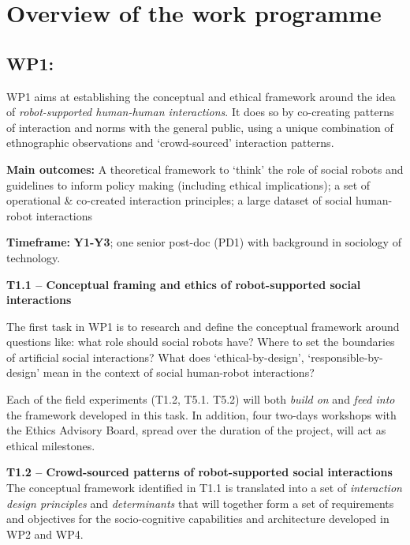 \section{Overview of the \project work programme}


\subsection{WP1: \textbf{\wpOne}}

WP1 aims at establishing the conceptual and ethical framework around the idea of
\emph{robot-supported human-human interactions}. It does so by co-creating
patterns of interaction and norms with the general public, using a unique
combination of ethnographic observations and `crowd-sourced' interaction
patterns.

\begin{framed}
    \textbf{Main outcomes:} A theoretical framework to `think' the role of
    social robots and guidelines to inform policy making (including ethical
    implications); a set of operational \& co-created interaction principles; a
    large dataset of social human-robot interactions

    \textbf{Timeframe:} \textbf{Y1-Y3}; one senior post-doc (PD1)
with background in sociology of technology.
\end{framed}


\textbf{T1.1 -- Conceptual framing and ethics of robot-supported social
interactions}


The first task in WP1 is to research and define the conceptual framework around
questions like: what role should social robots have? Where
to set the boundaries of artificial social interactions? What does
`ethical-by-design', `responsible-by-design' mean in the context of social
human-robot interactions? 

Each of the field experiments (T1.2, T5.1. T5.2) will both \emph{build on} and
\emph{feed into} the framework developed in this task. In addition, four
two-days workshops with the \project Ethics Advisory Board, spread over the
duration of the project, will act as ethical milestones.

\textbf{T1.2 -- Crowd-sourced patterns of robot-supported social
interactions} The conceptual framework identified in T1.1 is translated
into a set of \emph{interaction design principles} and \emph{determinants} that
will together form a set of requirements and objectives for the socio-cognitive
capabilities and architecture developed in WP2 and WP4.

